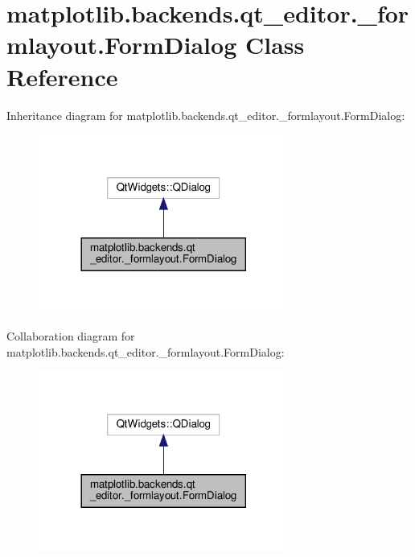\hypertarget{classmatplotlib_1_1backends_1_1qt__editor_1_1__formlayout_1_1FormDialog}{}\section{matplotlib.\+backends.\+qt\+\_\+editor.\+\_\+formlayout.\+Form\+Dialog Class Reference}
\label{classmatplotlib_1_1backends_1_1qt__editor_1_1__formlayout_1_1FormDialog}


Inheritance diagram for matplotlib.\+backends.\+qt\+\_\+editor.\+\_\+formlayout.\+Form\+Dialog\+:
\nopagebreak
\begin{figure}[H]
\begin{center}
\leavevmode
\includegraphics[width=233pt]{classmatplotlib_1_1backends_1_1qt__editor_1_1__formlayout_1_1FormDialog__inherit__graph}
\end{center}
\end{figure}


Collaboration diagram for matplotlib.\+backends.\+qt\+\_\+editor.\+\_\+formlayout.\+Form\+Dialog\+:
\nopagebreak
\begin{figure}[H]
\begin{center}
\leavevmode
\includegraphics[width=233pt]{classmatplotlib_1_1backends_1_1qt__editor_1_1__formlayout_1_1FormDialog__coll__graph}
\end{center}
\end{figure}
